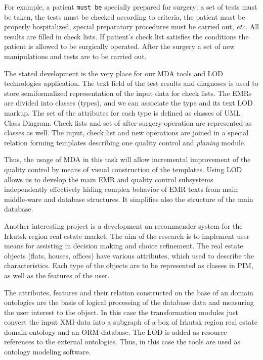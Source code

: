 \documentclass[conference,a4paper]{IEEEtran}
\begin{document}
For example, a patient \texttt{must be} specially prepared for surgery: a set of tests must be taken, the tests must be checked according to criteria, the patient must be properly hospitalized, special preparatory procedures must be carried out, \emph{etc.}  All results are filled in check lists.   If patient's check list satisfies the conditions the patient is allowed to be surgically operated.  After the surgery a set of new manipulations and tests are to be carried out.

The stated development is the very place for our MDA tools and LOD technologies application.  The text field of the test results and diagnoses is used to store semiformalized representation of the input data for check lists.  The EMRs are divided into classes (types), and we can associate the type and its text LOD markup.  The set of the attributes for each type is defined as classes of UML Class Diagram.  Check lists and set of after-surgery-operation are represented as classes as well.  The input, check list and new operations are joined in a special relation forming templates describing one quality control and \emph{planing} module.

Thus, the usage of MDA in this task will allow incremental improvement of the quality control by means of visual construction of the templates.  Using LOD allows us to develop the main EMR and quality control subsystems independently effectively hiding complex behavior of EMR texts from main middle-ware and database structures.  It simplifies also the structure of the main database.

Another interesting project is a development an recommender system for the Irkutsk region real estate market.  The aim of the research is to implement user means for  assisting in decision making and choice refinement.  The real estate objects (flats, houses, offices) have various attributes, which used to describe the characteristics.  Each type of the objects are to be represented as classes in PIM, as well as the features of the user.

The attributes, features and their relation constructed on the base of an domain ontologies are the basis of logical processing of the database data and measuring the user interest to the object.  In this case the transformation modules just convert the input XMI-data into a subgraph of a-box of Irkutsk region real estate domain ontology and an ORM-database.  The LOD is added as resource references to the external ontologies.  Thus, in this case the tools are used as ontology modeling software.
\end{document}
